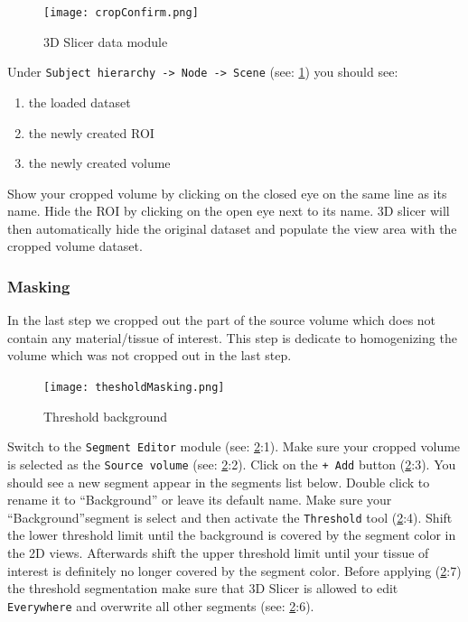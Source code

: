 \begin{figure}[h!]
	\centerline{
		\texttt{[image: cropConfirm.png]}}
	\caption{3D Slicer data module}\label{fig:cC}
\end{figure}
\pagebreak
\newline
Under \texttt{Subject hierarchy -> Node -> Scene} (see: \cref{fig:cC}) you should see:
\begin{enumerate}
	\item the loaded dataset
	\item the newly created ROI
	\item the newly created volume
\end{enumerate}
Show your cropped volume by clicking on the closed eye on the same line as its name. Hide the ROI by clicking on the open eye next to its name.
3D slicer will then automatically hide the original dataset and populate the view area with the cropped volume dataset.

\subsubsection{Masking}\label{mask}
In the last step we cropped out the part of the source volume which does not contain any material/tissue of interest.
This step is dedicate to homogenizing the volume which was not cropped out in the last step.
\begin{figure}[h!]
	\centerline{
		\texttt{[image: thesholdMasking.png]}}
	\caption{Threshold background}\label{fig:tM}
\end{figure}
Switch to the \texttt{Segment Editor} module (see: \cref{fig:tM}:1).
Make sure your cropped volume is selected as the \texttt{Source volume} (see: \cref{fig:tM}:2).
Click on the \texttt{+ Add} button (\cref{fig:tM}:3). You should see a new segment appear in the segments list below.
Double click to rename it to ``Background'' or leave its default name.
Make sure your ``Background''segment is select and then activate the \texttt{Threshold} tool (\cref{fig:tM}:4).
Shift the lower threshold limit until the background is covered by the segment color in the 2D views. Afterwards shift the upper threshold limit until your tissue of interest is definitely no longer covered by the segment color.
Before applying (\cref{fig:tM}:7) the threshold segmentation make sure that 3D Slicer is allowed to edit \texttt{Everywhere} and overwrite all other segments (see: \cref{fig:tM}:6).

